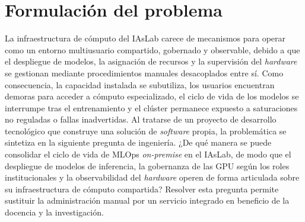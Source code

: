 \section{Formulación del problema}

La infraestructura de cómputo del IAsLab carece de mecanismos para operar como un entorno multiusuario compartido, gobernado y observable, debido a que el despliegue de modelos, la asignación de recursos y la supervisión del \emph{hardware} se gestionan mediante procedimientos manuales desacoplados entre sí. Como consecuencia, la capacidad instalada se subutiliza, los usuarios encuentran demoras para acceder a cómputo especializado, el ciclo de vida de los modelos se interrumpe tras el entrenamiento y el clúster permanece expuesto a saturaciones no reguladas o fallas inadvertidas. Al tratarse de un proyecto de desarrollo tecnológico que construye una solución de \emph{software} propia, la problemática se sintetiza en la siguiente pregunta de ingeniería. ¿De qué manera se puede consolidar el ciclo de vida de MLOps \emph{on-premise} en el IAsLab, de modo que el despliegue de modelos de inferencia, la gobernanza de las GPU según los roles institucionales y la observabilidad del \emph{hardware} operen de forma articulada sobre su infraestructura de cómputo compartida? Resolver esta pregunta permite sustituir la administración manual por un servicio integrado en beneficio de la docencia y la investigación.

